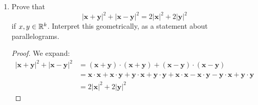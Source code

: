 \begin{enumerate}
\begin{enumerate}[(a)]
\begin{proof} Let $\textbf{m} = \frac{1}{2} ( \textbf{x} + \textbf{y} )$. Without loss of generality, suppose $\textbf{y} = -\textbf{x}$, translating when necessary. Also, let $t = \sqrt{r^2 - d^2/4}$, which is well defined since $2r > d$. Then, the set of vectors on the hyperplane orthogonal to the line crossing $\textbf{x}$ and $\textbf{y}$ with distance $t$ to $\textbf{m}$ satisfy the required equation, and there are infinitely many.
\end{proof}

\item If $2r = d$, there is exactly one such $\textbf{z}$.

\begin{proof}
If such a $\textbf{z}$ existed, then $d = |\textbf{x} - \textbf{y}| \le |\textbf{x} - \textbf{z}| + |\textbf{z} - \textbf{y}| = 2r = d$, so equality must hold in the triangle inequality. This happens when the three points are co-linear, and there is a unique point which satisfies this, namely $\textbf{z} = \textbf{m}$ as defined above.
\end{proof}

\item If $2r < d$, there are no such $\textbf{z}$.
\begin{proof}
If such a $\textbf{z}$ existed, then $d = |\textbf{x} - \textbf{y}| \le |\textbf{x} - \textbf{z}| + |\textbf{z} - \textbf{y}| = 2r < d$, a contradiction.
\end{proof}
\end{enumerate}

How must these statements be modified if $k < 3$?

\begin{proof}
If $k = 2$, then (a) will have 2 solutions instead, and everything else remains the same. If $k = 1$, (a) will have no solutions.
\end{proof}

\item Prove that
\[
	|\textbf{x} + \textbf{y}|^2 + |\textbf{x} - \textbf{y}|^2 = 2 |\textbf{x}|^2 + 2 |\textbf{y}|^2
\]
if $x, y \in \mathbb{R}^k$. Interpret this geometrically, as a statement about parallelograms.

\begin{proof}
We expand:
\begin{align*}
|\textbf{x} + \textbf{y}|^2 + |\textbf{x} - \textbf{y}|^2 &= (\textbf{x} + \textbf{y}) \cdot (\textbf{x} + \textbf{y}) + (\textbf{x} - \textbf{y}) \cdot (\textbf{x} - \textbf{y}) \\
	&= \textbf{x} \cdot \textbf{x} + \textbf{x} \cdot \textbf{y} + \textbf{y} \cdot \textbf{x} + \textbf{y} \cdot \textbf{y} + \textbf{x} \cdot \textbf{x} - \textbf{x} \cdot \textbf{y} - \textbf{y} \cdot \textbf{x} + \textbf{y} \cdot \textbf{y} \\
	&= 2 |\textbf{x}|^2 + 2 |\textbf{y}|^2
\end{align*}


\end{proof}
\end{enumerate}
